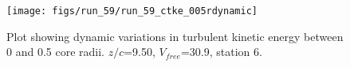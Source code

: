 \begin{figure}[H]
\centering
\texttt{[image: figs/run\_59/run\_59\_ctke\_005rdynamic]}
\caption{Plot showing dynamic variations in turbulent kinetic energy between 0 and 0.5 core radii. $z/c$=9.50, $V_{free}$=30.9, station 6.}
\label{fig:run_59_ctke_005rdynamic}
\end{figure}


